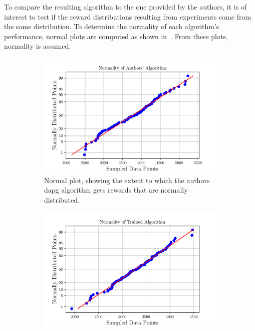 To compare the resulting algorithm to the one provided by the authors, it is of interest to test if the reward distributions resulting from experiments come from the same distribution. To determine the normality of each algorithm's performance, normal plots are computed as shown in~. From these plots, normality is assumed.

\begin{figure}[!h]
	\centering
	\begin{subfigure}[b]{0.48\textwidth}
		\centering
		\includegraphics[width=\textwidth]{chapters/3-in-hand-manipulation/fig/sampled-data-points-vs-normally-distributed-points-authors.pdf}
		\caption{Normal plot, showing the extent to which the authors \gls{dapg} algorithm gets rewards that are normally distributed. }
		\label{fig:sampled-data-points-vs-normally-distributed-points-authors}
	\end{subfigure}
	\hfill
	\begin{subfigure}[b]{0.48\textwidth}
		\centering
		\includegraphics[width=\textwidth]{chapters/3-in-hand-manipulation/fig/sampled-data-points-vs-normally-distributed-points-trained.pdf}

\end{subfigure}
\end{figure}
